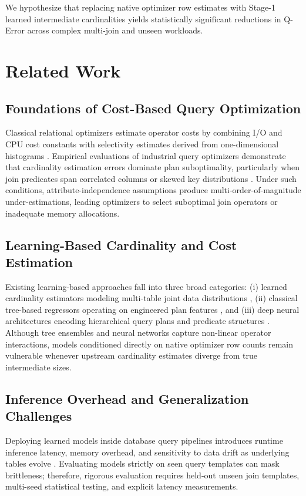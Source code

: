 \documentclass[conference]{IEEEtran}
\begin{document}
We hypothesize that replacing native optimizer row estimates with Stage-1 learned intermediate cardinalities yields statistically significant reductions in Q-Error across complex multi-join and unseen workloads.

\section{Related Work}
\subsection{Foundations of Cost-Based Query Optimization}
Classical relational optimizers estimate operator costs by combining I/O and CPU cost constants with selectivity estimates derived from one-dimensional histograms \cite{b1, b2}. Empirical evaluations of industrial query optimizers demonstrate that cardinality estimation errors dominate plan suboptimality, particularly when join predicates span correlated columns or skewed key distributions \cite{b2}. Under such conditions, attribute-independence assumptions produce multi-order-of-magnitude under-estimations, leading optimizers to select suboptimal join operators or inadequate memory allocations.

\subsection{Learning-Based Cardinality and Cost Estimation}
Existing learning-based approaches fall into three broad categories: (i) learned cardinality estimators modeling multi-table joint data distributions \cite{b1}, (ii) classical tree-based regressors operating on engineered plan features \cite{b3}, and (iii) deep neural architectures encoding hierarchical query plans and predicate structures \cite{b4, b5, b6}. Although tree ensembles and neural networks capture non-linear operator interactions, models conditioned directly on native optimizer row counts remain vulnerable whenever upstream cardinality estimates diverge from true intermediate sizes.

\subsection{Inference Overhead and Generalization Challenges}
Deploying learned models inside database query pipelines introduces runtime inference latency, memory overhead, and sensitivity to data drift as underlying tables evolve \cite{b6, b7}. Evaluating models strictly on seen query templates can mask brittleness; therefore, rigorous evaluation requires held-out unseen join templates, multi-seed statistical testing, and explicit latency measurements.
\end{document}
